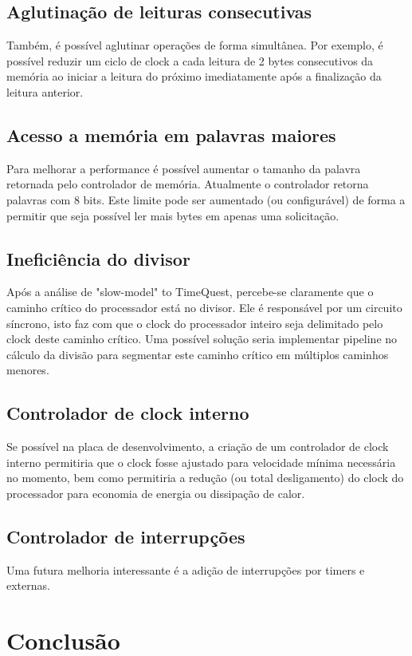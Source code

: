 \documentclass[11pt]{report}
\begin{document}
\section*{Aglutinação de leituras consecutivas}
Também, é possível aglutinar operações de forma simultânea. Por exemplo, é possível reduzir um ciclo de clock a cada leitura de 2 bytes consecutivos da memória ao iniciar a leitura do próximo imediatamente após a finalização da leitura anterior.

\section*{Acesso a memória em palavras maiores}
Para melhorar a performance é possível aumentar o tamanho da palavra retornada pelo controlador de memória. Atualmente o controlador retorna palavras com 8 bits. Este limite pode ser aumentado (ou configurável) de forma a permitir que seja possível ler mais bytes em apenas uma solicitação.

\section*{Ineficiência do divisor}
Após a análise de "slow-model" to TimeQuest, percebe-se claramente que o caminho crítico do processador está no divisor. Ele é responsável por um circuito síncrono, isto faz com que o clock do processador inteiro seja delimitado pelo clock deste caminho crítico. Uma possível solução seria implementar pipeline no cálculo da divisão para segmentar este caminho crítico em múltiplos caminhos menores.

\section*{Controlador de clock interno}
Se possível na placa de desenvolvimento, a criação de um controlador de clock interno permitiria que o clock fosse ajustado para velocidade mínima necessária no momento, bem como permitiria a redução (ou total desligamento) do clock do processador para economia de energia ou dissipação de calor.

\section*{Controlador de interrupções}
Uma futura melhoria interessante é a adição de interrupções por timers e externas.

\chapter{Conclusão}
\end{document}
